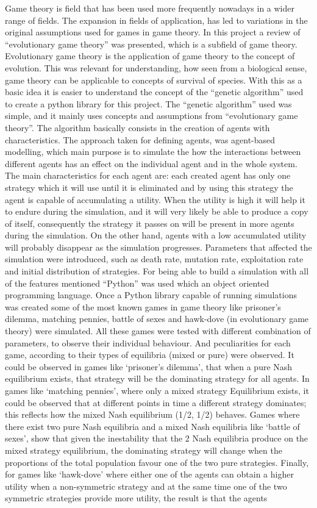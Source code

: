 Game theory is field that has been used more frequently nowadays in a wider range of fields. The expansion in fields of application, has led to variations in the original assumptions used for games in game theory. In this project a review of  ``evolutionary game theory'' was presented, which is a subfield of game theory. Evolutionary game theory is the application of game theory to the concept of evolution. This was relevant for understanding, how seen from a biological sense, game theory can be applicable to concepts of survival of species. With this as a basic idea it is easier to understand the concept of the ``genetic algorithm'' used to create a python library for this project. The ``genetic algorithm'' used was simple, and it mainly uses concepts and assumptions from ``evolutionary game theory''. The algorithm basically consists in the creation of agents with characteristics. The approach taken for defining agents, was agent-based modelling, which main purpose is to simulate the how the interactions between different agents has an effect on the individual agent and in the whole system. The main characteristics for each agent are: each created agent has only one strategy which it will use until it is eliminated and by using this strategy the agent is capable of accumulating a utility. When the utility is high it will help it to endure during the simulation, and it will very likely be able to produce a copy of itself, consequently the strategy it passes on will be present in more agents during the simulation. On the other hand, agents with a low accumulated utility will probably disappear as the simulation progresses. Parameters that affected  the simulation were introduced, such as death rate, mutation rate, exploitation rate and initial distribution of strategies. For being able to build a simulation with all of the features mentioned ``Python'' was used which an object oriented programming language. Once a Python library capable of running simulations was created some of the most known games in game theory like prisoner's dilemma, matching pennies, battle of sexes and hawk-dove (in evolutionary game theory) were simulated. All these games were tested with different combination of parameters, to observe their individual behaviour. And peculiarities for each game, according to their types of equilibria (mixed or pure) were observed. It could be observed in games like `prisoner's dilemma', that when a pure Nash equilibrium exists, that strategy will be the dominating strategy for all agents. In games like `matching pennies', where only a mixed strategy Equilibrium exists, it could be observed that at different points in time a different strategy dominates; this reflects how the mixed Nash equilibrium (1/2, 1/2) behaves. Games where there exist two pure Nash equilibria and a mixed Nash equilibria like `battle of sexes', show that given the inestability that the 2 Nash equilibria produce on the mixed strategy equilibrium, the dominating strategy will change when the proportions of the total population favour one of the two pure strategies. Finally, for games like `hawk-dove' where either one of the agents can obtain a higher utility when a non-symmetric strategy and at the same time one of the two symmetric strategies provide more utility, the result is that the agents 